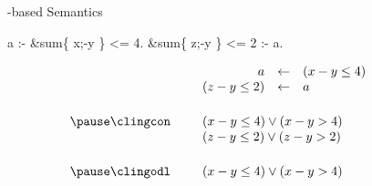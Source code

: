 \begin{frame}[fragile]{\HTC-based Semantics}
  \smallskip
  \begin{semiverbatim}
                           a :- &sum\{ x;-y \} <= 4.
            &sum\{ z;-y \} <= 2 :- a.
  \end{semiverbatim}
  \bigskip\pause
  \[
    \begin{array}{rp{5pt}rclp{20pt}}
                     && a            &\leftarrow&  (x-y\leq 4)          &\\
                     && (z-y\leq 2)  &\leftarrow&  a                  &\\[15pt]\pause
    \text{\clingcon} && \multicolumn{3}{l}{(x-y\leq 4) \vee (x-y > 4)} &\\
                     && \multicolumn{3}{l}{(z-y\leq 2) \vee (z-y>2)}   &\\[15pt]\pause
    \text{\clingodl} && \multicolumn{3}{l}{(x-y\leq 4) \vee (x-y > 4)} &
    \end{array}
  \]
\end{frame}
%
